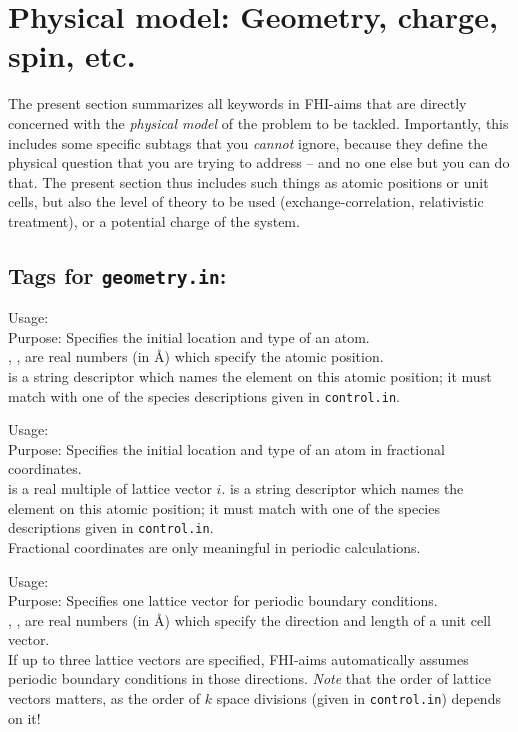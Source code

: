 \section{Physical model: Geometry, charge, spin, etc.}

The present section summarizes all keywords in FHI-aims that are directly
concerned with the \emph{physical model} of the problem to be
tackled. Importantly, this includes some specific subtags that you
\emph{cannot} ignore, because they define the physical question that you are
trying to address -- and no one else but you can do that. The present section
thus includes such things as atomic positions or unit cells, but also the
level of theory to be used (exchange-correlation, relativistic treatment), or
a potential charge of the system. 

\subsection*{Tags for \texttt{geometry.in}:}

{
  \noindent
  Usage:    
   \\[1.0ex]
  Purpose: Specifies the initial location and type of an atom. \\[1.0ex]
  , ,  are real numbers (in \AA) which
  specify the atomic position. \\
   is a string descriptor which names the element on
    this atomic position; it must match with one of the species descriptions
    given in \texttt{control.in}. \\
}

{
  \noindent
  Usage:    
   \\[1.0ex]
  Purpose: Specifies the initial location and type of an atom in fractional coordinates. \\[1.0ex]
   is a real multiple of lattice vector $i$.
   is a string descriptor which names the element on
    this atomic position; it must match with one of the species descriptions
    given in \texttt{control.in}. \\
}
Fractional coordinates are only meaningful in periodic calculations.

{
  \noindent
  Usage:     \\[1.0ex]
  Purpose: Specifies one lattice vector for periodic boundary conditions. \\[1.0ex]
  , ,  are real numbers (in \AA) which
  specify the direction and length of a unit cell vector. \\
}
If up to three lattice vectors are specified, FHI-aims automatically assumes
periodic boundary conditions in those directions. \emph{Note} that the
order of lattice vectors matters, as the order of $k$ space divisions (given
in \texttt{control.in}) depends on it!


